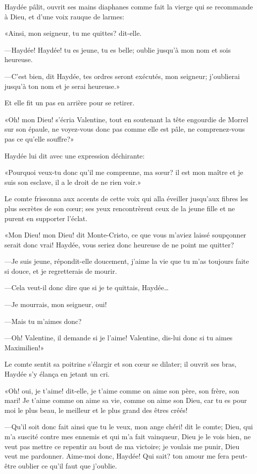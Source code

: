 Haydée pâlit, ouvrit ses mains diaphanes comme fait la vierge qui se recommande à Dieu, et d'une voix rauque de larmes: 

«Ainsi, mon seigneur, tu me quittes? dit-elle. 

—Haydée! Haydée! tu es jeune, tu es belle; oublie jusqu'à mon nom et sois heureuse. 

—C'est bien, dit Haydée, tes ordres seront exécutés, mon seigneur; j'oublierai jusqu'à ton nom et je serai heureuse.» 

Et elle fit un pas en arrière pour se retirer. 

«Oh! mon Dieu! s'écria Valentine, tout en soutenant la tête engourdie de Morrel sur son épaule, ne voyez-vous donc pas comme elle est pâle, ne comprenez-vous pas ce qu'elle souffre?» 

Haydée lui dit avec une expression déchirante: 

«Pourquoi veux-tu donc qu'il me comprenne, ma sœur? il est mon maître et je suis son esclave, il a le droit de ne rien voir.» 

Le comte frissonna aux accents de cette voix qui alla éveiller jusqu'aux fibres les plus secrètes de son cœur; ses yeux rencontrèrent ceux de la jeune fille et ne purent en supporter l'éclat. 

«Mon Dieu! mon Dieu! dit Monte-Cristo, ce que vous m'aviez laissé soupçonner serait donc vrai! Haydée, vous seriez donc heureuse de ne point me quitter? 

—Je suis jeune, répondit-elle doucement, j'aime la vie que tu m'as toujours faite si douce, et je regretterais de mourir. 

—Cela veut-il donc dire que si je te quittais, Haydée\dots 

—Je mourrais, mon seigneur, oui! 

—Mais tu m'aimes donc? 

—Oh! Valentine, il demande si je l'aime! Valentine, dis-lui donc si tu aimes Maximilien!» 

Le comte sentit sa poitrine s'élargir et son cœur se dilater; il ouvrit ses bras, Haydée s'y élança en jetant un cri. 

«Oh! oui, je t'aime! dit-elle, je t'aime comme on aime son père, son frère, son mari! Je t'aime comme on aime sa vie, comme on aime son Dieu, car tu es pour moi le plus beau, le meilleur et le plus grand des êtres créés! 

—Qu'il soit donc fait ainsi que tu le veux, mon ange chéri! dit le comte; Dieu, qui m'a suscité contre mes ennemis et qui m'a fait vainqueur, Dieu je le vois bien, ne veut pas mettre ce repentir au bout de ma victoire; je voulais me punir, Dieu veut me pardonner. Aime-moi donc, Haydée! Qui sait? ton amour me fera peut-être oublier ce qu'il faut que j'oublie. 

